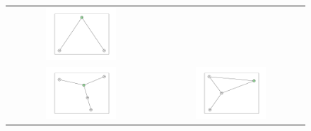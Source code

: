 \documentclass[12pt, a4paper]{extarticle}
\begin{document}
\begin{figure}
\begin{tabularx}{\textwidth}{cc}
\includegraphics[width=0.5\textwidth]{task11-graphlets/3_21-23-24.pdf} \\
\includegraphics[width=0.5\textwidth]{task11-graphlets/5_16-21-18-23-24.pdf} &
\includegraphics[width=0.5\textwidth]{task11-graphlets/4_16-21-25-23.pdf} \\
\end{tabularx}\end{figure}
\end{document}
